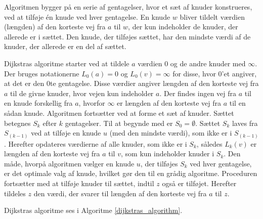 Algoritmen bygger på en serie af gentagelser, hvor et sæt af knuder konstrueres, ved at tilføje én knude ved hver gentagelse. 
En knude $w$ bliver tildelt værdien (længden) af den korteste vej fra $a$ til $w$, der kun indeholder de knuder, der allerede er i sættet. 
Den knude, der tilføjes sættet, har den mindste værdi af de knuder, der allerede er en del af sættet.

Dijkstras algoritme starter ved at tildele $a$ værdien $0$ og de andre knuder med $\infty$. 
Der bruges notationerne $L_0(a)=0$ og $L_0(v)= \infty$ for disse, hvor $0$’et angiver, at det er den $0$te gentagelse. 
Disse værdier angiver længden af den korteste vej fra $a$ til de givne knuder, hvor vejen kun indeholder $a$. 
Der findes ingen vej fra $a$ til en knude forskellig fra $a$, hvorfor $\infty$ er længden af den korteste vej fra $a$ til en sådan knude.
Algoritmen fortsætter ved at forme et sæt af knuder. Sættet betegnes $S_k$ efter $k$ gentagelser. 
Til at begynde med er $S_0=\emptyset$. 
Sættet $S_k$ laves fra $S_(k-1)$ ved at tilføje en knude $u$ (med den mindste værdi), som ikke er i $S_(k-1)$.
Herefter opdateres værdierne af alle knuder, som ikke er i $S_k$, således $L_k(v)$ er længden af den korteste vej fra $a$ til $v$, som kun indeholder knuder i $S_k$. 
Den måde, hvorpå algoritmen vælger en knude $u$, der tilføjes $S_k$ ved hver gentagelse, er det optimale valg af knude, hvilket gør den til en grådig algoritme. 
Proceduren fortsætter med at tilføje knuder til sættet, indtil $z$ også er tilføjet.
Herefter tildeles $z$ den værdi, der svarer til længden af den korteste vej fra $a$ til $z$.

Dijkstras algoritme ses i Algoritme \ref{dijkstras_algorithm}.

